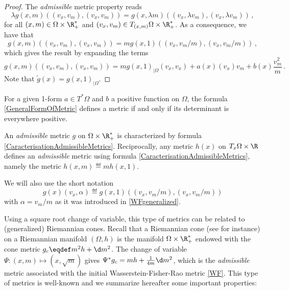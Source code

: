 \begin{proof}
The \emph{admissible} metric property reads
\begin{equation}\label{BiInvariance}
\lambda g(x,m)((v_x,v_m),(v_x,v_m)) = g(x,\lambda m)((v_x,\lambda v_m),(v_x,\lambda v_m)) \,,
\end{equation}
for all $(x,m) \in \Omega \times \R_+^*$ and $(v_x,v_m) \in T_{(x,m)} \Omega \times \R_+^*$.
As a consequence, we have that 
\begin{equation}\label{CaracterisationAdmissibleMetrics}
g(x,m)((v_x,v_m),(v_x,v_m))= m g(x,1)((v_x,v_m/m),(v_x,v_m/m))\,,
\end{equation}
which gives the result by expanding the terms $$g(x,m)((v_x,v_m),(v_x,v_m)) = m g(x,1)_{|\Omega}(v_x,v_x) + a(x)(v_x)v_m + b(x)\frac{v_m^2}{m}\,.$$ Note that $\tilde{g}(x) =  g(x,1)_{|\Omega}$.
\end{proof}
For a given 1-form $a \in T^*\Omega$ and $b$ a positive function on $\Omega$, the formula \eqref{GeneralFormOfMetric} defines a metric if and only if its determinant is everywhere positive.



\begin{corollary}
An \textit{admissible} metric $g$ on $\Omega \times \R_+^*$ is characterized by formula \eqref{CaracterisationAdmissibleMetrics}. Reciprocally, any metric $h(x)$ on $T_x\Omega \times \R$ defines an \textit{admissible} metric using formula \eqref{CaracterisationAdmissibleMetrics}, namely the metric $h(x,m) \eqdef m h(x,1)$. 
\end{corollary}


We will also use the short notation 
\begin{equation}   \label{ShortNotation}
g(x)(v_x,\alpha) \eqdef g(x,1)((v_x,v_m/m),(v_x,v_m/m))
\end{equation}
with $\alpha = v_m/m$ as it was introduced in \eqref{WFgeneralized}.


Using a square root change of variable, this type of metrics can be related to (generalized) Riemannian cones. Recall that a Riemannian cone (see \cite{Gallot1979,MetricGeometryBurago} for instance) on a Riemannian manifold $(\Omega,h)$ is the manifold $\Omega \times \R_+^*$ endowed with the cone metric $g_c \eqdef m^2 h + \d m^2$. The change of variable $\Psi: (x,m) \mapsto (x,\sqrt{m})$ gives  $\Psi^*g_c= m h + \frac 1{4m}\d m^2$, which is the \textit{admissible} metric associated with the initial Wasserstein-Fisher-Rao metric \eqref{WF}. This type of metrics is well-known and we summarize hereafter some important properties:


